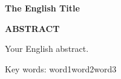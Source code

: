 \begin{center}
    {\textbf{The English Title}}

    {\vspace{1em}{Wukong Sun}}

    {\vspace{1em}\textbf{ABSTRACT}}
\end{center}
\vspace{1em}
\begin{spacing}{1.25}
Your English abstract.
\end{spacing}

Key words: word1\quad word2\quad word3

\clearpage									%
